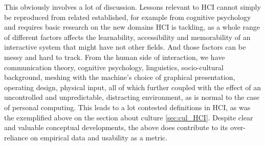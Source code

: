     This obviously involves a lot of discussion. Lessons relevant to HCI cannot simply be reproduced from related established, for example from cognitive psychology \cite{LANDAUER1995} and requires basic research on the new domains HCI is tackling, as a whole range of different factors affects the learnability, accessibility and memorability of an interactive system that might have not other fields. And those factors can be messy and hard to track. From the human side of interaction, we have communication theory, cognitive psychology, linguistics, socio-cultural background, meshing with the machine’s choice of graphical presentation, operating design, physical input, all of which further coupled with the effect of an uncontrolled and unpredictable, distracting environment, as is normal to the case of personal computing. This leads to a lot contested definitions in HCI, as was the exemplified above on the section about culture \ref{sec:cul_HCI}. Despite clear and valuable conceptual developments, the above does contribute to its over-reliance on empirical data and usability as a metric\cite{rogers2004}\cite{LANDAUER1995}.

